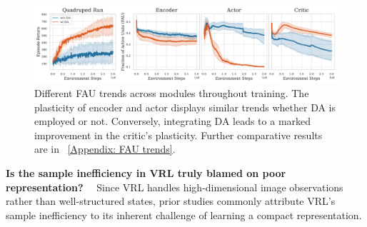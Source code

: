 \begin{figure}[h]
  \centering
  \vspace{-1.1\baselineskip}
  \includegraphics[width=\textwidth]{Figures/2Modules/FAU_quadruped_run.pdf} 
  \vspace{-2\baselineskip}
  \caption{Different FAU trends across modules throughout training. The plasticity of encoder and actor displays similar trends whether DA is employed or not. Conversely, integrating DA leads to a marked improvement in the critic's plasticity. Further comparative results are in \Appendix~\ref{Appendix: FAU trends}.}
  \label{Fig:FAU}
\end{figure}

\textbf{Is the sample inefficiency in VRL truly blamed on poor representation?}~~
Since VRL handles high-dimensional image observations rather than well-structured states, prior studies commonly attribute VRL's sample inefficiency to its inherent challenge of learning a compact representation. 

